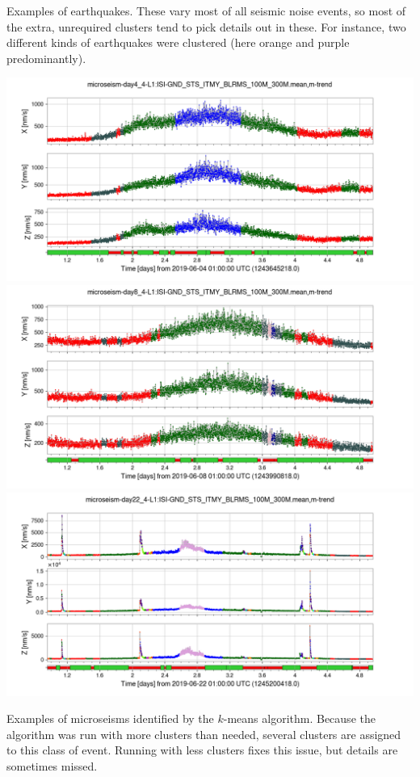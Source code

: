 \documentclass[colorlinks=true,pdfstartview=FitV,linkcolor=blue,
            citecolor=red,urlcolor=magenta]{ligodoc}
\begin{document}
{}{
  \caption{Examples of earthquakes. These vary most of all seismic noise events, so most of the extra, unrequired clusters tend to pick details out in these. For instance, two different kinds of earthquakes were clustered (here orange and purple predominantly).}\label{fig:eq}
}

\leftfigures
{
  \includegraphics[width=\textwidth]{assets/report1/microseism-day4_4-L1:ISI-GND_STS_ITMY_BLRMS_100M_300Mmean,m-trend.png}\\
  \includegraphics[width=\textwidth]{assets/report1/microseism-day8_4-L1:ISI-GND_STS_ITMY_BLRMS_100M_300Mmean,m-trend.png}\\
  \includegraphics[width=\textwidth]{assets/report1/microseism-day22_4-L1:ISI-GND_STS_ITMY_BLRMS_100M_300Mmean,m-trend.png}
}{
  \caption{Examples of microseisms identified by the $k$-means algorithm. Because the algorithm was run with more clusters than needed, several clusters are assigned to this class of event. Running with less clusters fixes this issue, but details are sometimes missed.}
}
\end{document}

